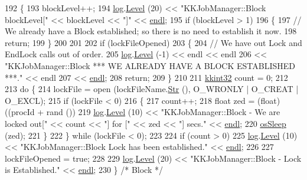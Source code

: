 \begin{DoxyCode}
192 \{
193   blockLevel++;
194   \hyperlink{class_k_k_job_managment_1_1_k_k_job_ad2466a68d9a01778e0f08af0478b94e5}{log}.\hyperlink{class_k_k_b_1_1_run_log_a32cf761d7f2e747465fd80533fdbb659}{Level} (20) << \textcolor{stringliteral}{"KKJobManager::Block    blockLevel["} << blockLevel << \textcolor{stringliteral}{"]"} << 
      \hyperlink{namespace_k_k_b_ad1f50f65af6adc8fa9e6f62d007818a8}{endl};
195   \textcolor{keywordflow}{if}  (blockLevel > 1)
196   \{
197     \textcolor{comment}{// We already have a Block established;  so there is no need to establish it now.}
198     \textcolor{keywordflow}{return};
199   \}
200 
201 
202   \textcolor{keywordflow}{if}  (lockFileOpened)
203   \{
204     \textcolor{comment}{// We have out Lock and EndLock calls out of order.}
205     \hyperlink{class_k_k_job_managment_1_1_k_k_job_ad2466a68d9a01778e0f08af0478b94e5}{log}.\hyperlink{class_k_k_b_1_1_run_log_a32cf761d7f2e747465fd80533fdbb659}{Level} (-1)  << endl << endl 
206                     << \textcolor{stringliteral}{"KKJobManager::Block      *** WE ALREADY HAVE A BLOCK ESTABLISHED ***."} << endl
207                     << \hyperlink{namespace_k_k_b_ad1f50f65af6adc8fa9e6f62d007818a8}{endl};
208     \textcolor{keywordflow}{return};
209   \}
210   
211   \hyperlink{namespace_k_k_b_a8fa4952cc84fda1de4bec1fbdd8d5b1b}{kkint32}  count = 0;
212 
213   \textcolor{keywordflow}{do}  \{
214     lockFile = open (lockFileName.\hyperlink{class_k_k_b_1_1_k_k_str_ad574e6c0fe7f6ce1ba3ab0a8ce2fbd52}{Str} (), O\_WRONLY | O\_CREAT | O\_EXCL);
215     \textcolor{keywordflow}{if}  (lockFile < 0)
216     \{
217       count++;
218       \textcolor{keywordtype}{float}  zed = (float)((procId + rand ()) %
219       \hyperlink{class_k_k_job_managment_1_1_k_k_job_ad2466a68d9a01778e0f08af0478b94e5}{log}.\hyperlink{class_k_k_b_1_1_run_log_a32cf761d7f2e747465fd80533fdbb659}{Level} (10) << \textcolor{stringliteral}{"KKJobManager::Block - We are locked out["} << count << \textcolor{stringliteral}{"]  for ["} << zed <<
       \textcolor{stringliteral}{"] secs."}  << \hyperlink{namespace_k_k_b_ad1f50f65af6adc8fa9e6f62d007818a8}{endl};
220       \hyperlink{namespace_k_k_b_a1a3717b963b0813e96b66d1953fce1af}{osSleep} (zed);
221     \}
222   \}  \textcolor{keywordflow}{while}  (lockFile < 0);
223 
224   \textcolor{keywordflow}{if}  (count > 0)
225     \hyperlink{class_k_k_job_managment_1_1_k_k_job_ad2466a68d9a01778e0f08af0478b94e5}{log}.\hyperlink{class_k_k_b_1_1_run_log_a32cf761d7f2e747465fd80533fdbb659}{Level} (10) << \textcolor{stringliteral}{"KKJobManager::Block   Lock has been established."} << 
      \hyperlink{namespace_k_k_b_ad1f50f65af6adc8fa9e6f62d007818a8}{endl};
226 
227   lockFileOpened = \textcolor{keyword}{true};
228 
229   \hyperlink{class_k_k_job_managment_1_1_k_k_job_ad2466a68d9a01778e0f08af0478b94e5}{log}.\hyperlink{class_k_k_b_1_1_run_log_a32cf761d7f2e747465fd80533fdbb659}{Level} (20) << \textcolor{stringliteral}{"KKJobManager::Block - Lock is Established."} << \hyperlink{namespace_k_k_b_ad1f50f65af6adc8fa9e6f62d007818a8}{endl};
230 \}  \textcolor{comment}{/* Block */}
\end{DoxyCode}
